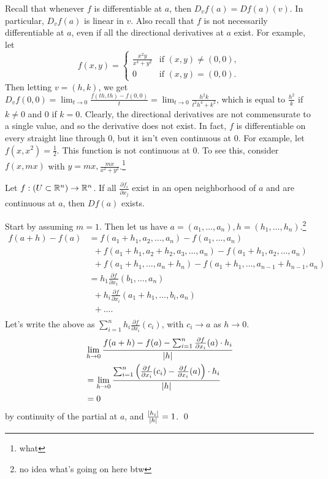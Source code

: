 \noindent Recall that whenever $f$ is differentiable at $a$, then $D_v f(a) = D f(a)(v)$. In particular, $D_v f(a)$ is linear in $v$. Also recall that $f$ is not necessarily differentiable at $a$, even if all the directional derivatives at $a$ exist. For example, let 
\[ f(x, y) = \begin{cases} \frac{x^2y}{x^4 + y^2} & \text{if } (x, y) \neq (0, 0), \\ 0 & \text{if } (x, y) = (0, 0). \end{cases} \]
Then letting $v = (h, k)$, we get $D_v f(0, 0) = \lim_{t \to 0} \frac{f(th, th) - f(0, 0)}{t} = \lim_{t \to 0} \frac{h^2 k}{t^2 h^4 + k^2}$, which is equal to $\frac{h^2}{k}$ if $k \neq 0$ and $0$ if $k = 0$. Clearly, the directional derivatives are not commensurate to a single value, and so the derivative does not exist. In fact, $f$ is differentiable on every straight line through $0$, but it isn't even continuous at $0$.
\medskip\newline
For example, let $f(x, x^2) = \frac{1}{2}$. This function is not continuous at $0$. To see this, consider $f(x, mx)$ with $y = mx, \frac{mx}{x^2 + y^2}$.\footnote{what}

\newpage
\begin{simplethm}
    Let $f : (U \subset \mathbb R^n) \to \mathbb R^n$. If all $\frac{\partial f_i}{\partial x_j}$ exist in an open neighborhood of $a$ and are continuous at $a$, then $Df(a)$ exists.
\end{simplethm}
\noindent Start by assuming $m = 1$. Then let us have $a = (a_1, \dots, a_n), h = (h_1, \dots, h_n)$.\footnote{no idea what's going on here btw}
\begin{align*}
    f(a + h) - f(a) &= f(a_1 + h_1, a_2, \dots, a_n) - f(a_1, \dots, a_n) \\
    & \,\,\, + f(a_1 + h_1, a_2 + h_2, a_3, \dots, a_n) - f(a_1 + h_1, a_2, \dots, a_n) \\
    & \,\,\, + f(a_1 + h_1, \dots, a_n + h_n) - f(a_1 + h_1, \dots, a_{n-1} + h_{n-1}, a_n) \\
    &= h_1 \frac{\partial f}{\partial x_1} (b_1, \dots, a_n) \\
    & \,\,\, + h_i \frac{\partial f}{\partial x_i} (a_1 + h_1, \dots, b_i, a_n) \\
    & \,\,\, + \dots. \\
\end{align*}
Let's write the above as $\sum_{i=1}^n h_i \frac{\partial f}{\partial x_i} (c_i)$, with $c_i \to a$ as $h \to 0$.
\begin{align*}
    & \lim_{h \to 0} \frac{f(a + h) - f(a) - \sum_{i=1}^n \frac{\partial f}{\partial x_i} (a) \cdot h_i}{\left\lvert h \right\rvert} \\
    &= \lim_{h \to 0} \frac{\sum_{i=1}^n \left(\frac{\partial f}{\partial x_i}(c_i) - \frac{\partial f}{\partial x_i}(a)\right) \cdot h_i}{\left\lvert h \right\rvert} \\
    &= 0 
\end{align*}
by continuity of the partial at $a$, and $\frac{\left\lvert h_i \right\rvert}{\left\lvert h \right\rvert} = 1$. \qed
